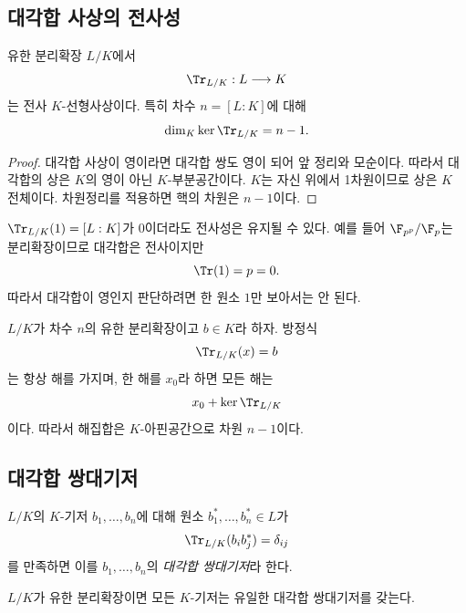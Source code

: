 \subsection{대각합 사상의 전사성}

\begin{corollary}
\label{cor:trace-surjective-separable}
유한 분리확장 $L/K$에서
\[
  \Tr_{L/K}:L\longrightarrow K
\]
는 전사 $K$-선형사상이다. 특히 차수 $n=[L:K]$에 대해
\[
  \dim_K\ker\Tr_{L/K}=n-1.
\]
\end{corollary}

\begin{proof}
대각합 사상이 영이라면 대각합 쌍도 영이 되어 앞 정리와 모순이다. 따라서 대각합의 상은 $K$의 영이 아닌 $K$-부분공간이다. $K$는 자신 위에서 1차원이므로 상은 $K$ 전체이다. 차원정리를 적용하면 핵의 차원은 $n-1$이다.
\end{proof}

\begin{remark}
$\Tr_{L/K}(1)=[L:K]$가 $0$이더라도 전사성은 유지될 수 있다. 예를 들어 $\F_{p^p}/\F_p$는 분리확장이므로 대각합은 전사이지만
\[
  \Tr(1)=p=0.
\]
따라서 대각합이 영인지 판단하려면 한 원소 $1$만 보아서는 안 된다.
\end{remark}

\begin{corollary}
\label{cor:trace-equation-affine-hyperplane}
$L/K$가 차수 $n$의 유한 분리확장이고 $b\in K$라 하자. 방정식
\[
  \Tr_{L/K}(x)=b
\]
는 항상 해를 가지며, 한 해를 $x_0$라 하면 모든 해는
\[
  x_0+\ker\Tr_{L/K}
\]
이다. 따라서 해집합은 $K$-아핀공간으로 차원 $n-1$이다.
\end{corollary}

\subsection{대각합 쌍대기저}

\begin{definition}
$L/K$의 $K$-기저 $b_1,\dots,b_n$에 대해 원소 $b_1^*,\dots,b_n^*\in L$가
\[
  \Tr_{L/K}(b_i b_j^*)=\delta_{ij}
\]
를 만족하면 이를 $b_1,\dots,b_n$의 \emph{대각합 쌍대기저}라 한다.
\end{definition}

\begin{corollary}
\label{cor:trace-dual-basis-exists}
$L/K$가 유한 분리확장이면 모든 $K$-기저는 유일한 대각합 쌍대기저를 갖는다.
\end{corollary}

